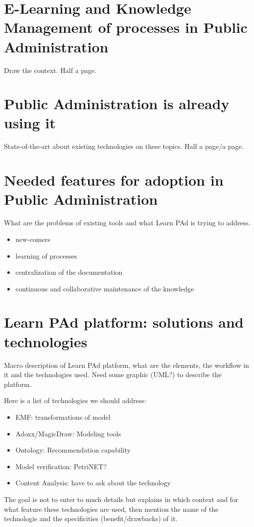 \documentclass{learnpad}
\begin{document}
\chapter{E-Learning and Knowledge Management of processes in Public Administration}
\label{ch:intro}
Draw the context. Half a page.

\chapter{Public Administration is already using it}
\label{ch:sota}
State-of-the-art about existing technologies on these topics.
Half a page/a page.

\chapter{Needed features for adoption in Public Administration}
\label{ch:problematic}
What are the problems of existing tools and what Learn PAd is trying to address.
\begin{itemize}
	\item new-comers
	\item learning of processes
	\item centralization of the documentation
	\item continuous and collaborative maintenance of the knowledge
\end{itemize}

\chapter{Learn PAd platform: solutions and technologies}
\label{ch:platform}
Macro description of Learn PAd platform, what are the elements, the workflow in it and the technologies used.
Need some graphic (UML?) to describe the platform.

Here is a list of technologies we should address:
\begin{itemize}
	\item EMF: transformations of model
	\item Adoxx/MagicDraw: Modeling tools
	\item Ontology: Recommendation capability
	\item Model verification: PetriNET?
	\item Content Analysis: have to ask about the technology
\end{itemize}
The goal is not to enter to much details but explains in which context and for what feature these technologies are used, then mention the name of the technologie and the specificities (benefit/drawbacks) of it.
\end{document}
